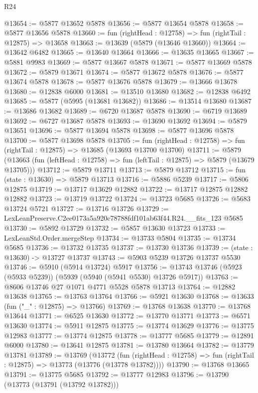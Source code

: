 \begin{lexlean}{R24}
\begin{coremodule}
@13654 := @5877 @13652 @5878
@13656 := @5877 @13654 @5878
@13658 := @5877 @13656 @5878
@13660 := fun (rightHead : @12758) => fun (rightTail : @12875) => @13658
@13663 := @13639 (@5879 (@13646 @13660))
@13664 := @13642 @6482
@13665 := @13640 @13664
@13666 := @13635 @13665
@13667 := @5881 @9983
@13669 := @5877 @13667 @5878
@13671 := @5877 @13669 @5878
@13672 := @5879 @13671
@13674 := @5877 @13672 @5878
@13676 := @5877 @13674 @5878
@13678 := @5877 @13676 @5878
@13679 := @13666 @13678
@13680 := @12838 @6000
@13681 := @13510 @13680
@13682 := @12838 @6492
@13685 := @5877 (@5995 (@13681 @13682))
@13686 := @13514 @13680
@13687 := @13686 @13682
@13689 := @6720 @13687 @5878
@13690 := @6719 @13689
@13692 := @6727 @13687 @5878
@13693 := @13690 @13692
@13694 := @5879 @13651
@13696 := @5877 @13694 @5878
@13698 := @5877 @13696 @5878
@13700 := @5877 @13698 @5878
@13705 := fun (rightHead : @12758) => fun (rightTail : @12875) => @13685 (@13693 @13700 @13700)
@13711 := @5879
    (@13663 (fun (leftHead : @12758) => fun (leftTail : @12875) => @5879 (@13679 @13705)))
@13712 := @5879 @13711
@13713 := @5879 @13712
@13715 := fun (state : @13630) => @5879 @13713
@13716 := @5886 @5239
@13717 := @5806 @12875
@13719 := @13717 @13629 @12882
@13722 := @13717 @12875 @12882 @12882
@13723 := @13719 @13722
@13724 := @13723 @5685
@13726 := @5683 @13724 @5721
@13727 := @13716 @13726
@13729 := LexLeanPreserve.C2ee0173a5a920c78788fdf101ab63f44.R24.__fits_123 @5685
@13730 := @5892 @13729
@13732 := @5857 @13630 @13723
@13733 := LexLeanStd.Order.mergeStep
@13734 := @13733 @5804
@13735 := @13734 @5685
@13736 := @13732 @13735
@13737 := @13730 @13736
@13739 := (state : @13630) -> @13727 @13737
@13743 := @5903 @5239 @13726 @13737 @5530
@13746 := @5910 (@5914 @13724) @5917
@13756 := @13743 @13746 (@5923 (@5933 @5239)) (@5939 (@5940 (@5941 @5530) @13726 @5917))
@13763 := @8606 @13746 @27 @1071 @4771 @5528 @5878 @13713
@13764 := @12882 @13638
@13765 := @13763 @13764
@13766 := @5921 @13630
@13768 := @13633 (fun ("_" : @12875) => @13766)
@13769 := @13768 @13638
@13770 := @13768 @13644
@13771 := @6525 @13630
@13772 := @13770 @13771
@13773 := @6571 @13630
@13774 := @5911 @12875
@13775 := @13774 @13629
@13776 := @13775 @12983
@13777 := @13774 @12875
@13778 := @13777 @5685
@13779 := @12891 @6000
@13780 := @13641 @12875
@13781 := @13780 @13664
@13782 := @13779 @13781
@13789 := @13769
    (@13772
      (fun (rightHead : @12758) => fun (rightTail : @12875) => @13773 (@13776 (@13778 @13782))))
@13790 := @13768 @13665
@13791 := @13775 @5685
@13792 := @13777 @12983
@13796 := @13790 (@13773 (@13791 (@13792 @13782)))

\end{coremodule}
\end{lexlean}

